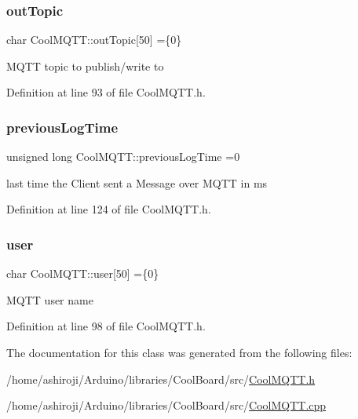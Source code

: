 \mbox{\label{class_cool_m_q_t_t_a109c786a17b463f9eeba046194279522}} 
\subsubsection{\texorpdfstring{out\+Topic}{outTopic}}
{\footnotesize\ttfamily char Cool\+M\+Q\+T\+T\+::out\+Topic\mbox{[}50\mbox{]} =\{\textquotesingle{}0\textquotesingle{}\}\hspace{0.3cm}{\ttfamily [private]}}

M\+Q\+TT topic to publish/write to 

Definition at line 93 of file Cool\+M\+Q\+T\+T.\+h.

\mbox{\label{class_cool_m_q_t_t_a3db37ef9ed3b05b2a8d44edba0e7d3cc}} 
\subsubsection{\texorpdfstring{previous\+Log\+Time}{previousLogTime}}
{\footnotesize\ttfamily unsigned long Cool\+M\+Q\+T\+T\+::previous\+Log\+Time =0\hspace{0.3cm}{\ttfamily [private]}}

last time the Client sent a Message over M\+Q\+TT in ms 

Definition at line 124 of file Cool\+M\+Q\+T\+T.\+h.

\mbox{\label{class_cool_m_q_t_t_a8cd47e45d457f908d4b4390b35aaee83}} 
\subsubsection{\texorpdfstring{user}{user}}
{\footnotesize\ttfamily char Cool\+M\+Q\+T\+T\+::user\mbox{[}50\mbox{]} =\{\textquotesingle{}0\textquotesingle{}\}\hspace{0.3cm}{\ttfamily [private]}}

M\+Q\+TT user name 

Definition at line 98 of file Cool\+M\+Q\+T\+T.\+h.



The documentation for this class was generated from the following files\+:\begin{DoxyCompactItemize}
\item 
/home/ashiroji/\+Arduino/libraries/\+Cool\+Board/src/\hyperlink{_cool_m_q_t_t_8h}{Cool\+M\+Q\+T\+T.\+h}\item 
/home/ashiroji/\+Arduino/libraries/\+Cool\+Board/src/\hyperlink{_cool_m_q_t_t_8cpp}{Cool\+M\+Q\+T\+T.\+cpp}\end{DoxyCompactItemize}
